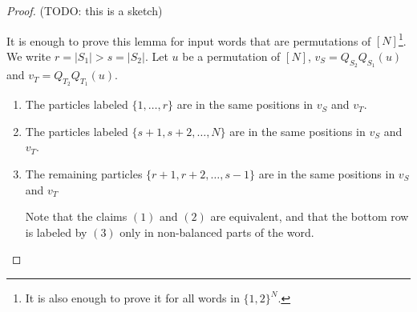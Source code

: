 \documentclass[reqno]{amsart}
\newcommand{\0}{\phantom{c}}
\theoremstyle{plain}
\theoremstyle{definition}
\numberwithin{equation}{section}
\begin{document}
\begin{proof} (TODO: this is a sketch)

It is enough to prove this lemma for input words that are permutations of $[N]$\footnote{It is also enough to prove it for all words in $\{1,2\}^N$.}.
We write $r = |S_1| > s = |S_2|$.
Let $u$ be a permutation of $[N]$, $v_S = Q_{S_2}Q_{S_1}(u)$ and $v_T = Q_{T_2}Q_{T_1}(u)$.

\begin{enumerate}
  \item The particles labeled $\{1, \dots, r\}$ are in the same positions in $v_S$ and $v_T$.
  \item The particles labeled $\{s+1, s+2, \dots, N\}$ are in the same positions in $v_S$ and $v_T$.
  \item The remaining particles $\{r+1, r+2, \dots, s-1\}$ are in the same positions in $v_S$ and $v_T$

Note that the claims $(1)$ and $(2)$ are equivalent, and that the bottom row is labeled by $(3)$ only in non-balanced parts of the word.
\end{enumerate}



\end{proof}
\end{document}
